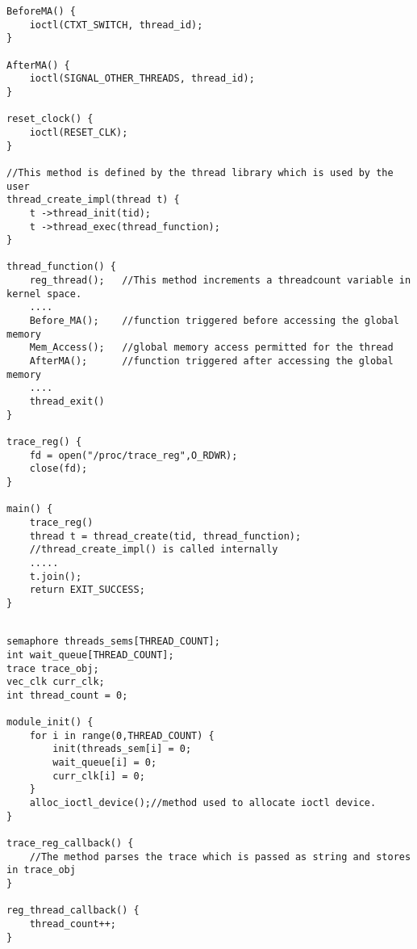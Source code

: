 \documentclass[11pt]{article}
\begin{document}
\begin{lstlisting}[title=User Space Implementation, style=customc]
BeforeMA() {	
	ioctl(CTXT_SWITCH, thread_id);	
}

AfterMA() {	
	ioctl(SIGNAL_OTHER_THREADS, thread_id);
}

reset_clock() {
	ioctl(RESET_CLK);
}

//This method is defined by the thread library which is used by the user
thread_create_impl(thread t) {
	t ->thread_init(tid);
	t ->thread_exec(thread_function);
}

thread_function() {
	reg_thread();	//This method increments a threadcount variable in kernel space.
	....	
	Before_MA(); 	//function triggered before accessing the global memory
	Mem_Access();   //global memory access permitted for the thread
	AfterMA();		//function triggered after accessing the global memory		
	....
	thread_exit()
}

trace_reg() {	
	fd = open("/proc/trace_reg",O_RDWR);
	close(fd);	
}

main() {	
	trace_reg()
	thread t = thread_create(tid, thread_function); 
	//thread_create_impl() is called internally
	.....
	t.join();	
	return EXIT_SUCCESS;
}


\end{lstlisting}
\begin{lstlisting}[title=Kernel Space - General module definitions, style=customc]
semaphore threads_sems[THREAD_COUNT];
int wait_queue[THREAD_COUNT];
trace trace_obj;
vec_clk curr_clk;
int thread_count = 0;

module_init() {
	for i in range(0,THREAD_COUNT) {
		init(threads_sem[i] = 0;
		wait_queue[i] = 0;
		curr_clk[i] = 0;
	}
	alloc_ioctl_device();//method used to allocate ioctl device.
}

trace_reg_callback() {
	//The method parses the trace which is passed as string and stores in trace_obj
}

reg_thread_callback() {
	thread_count++;
}

\end{lstlisting}
\newpage
\end{document}
